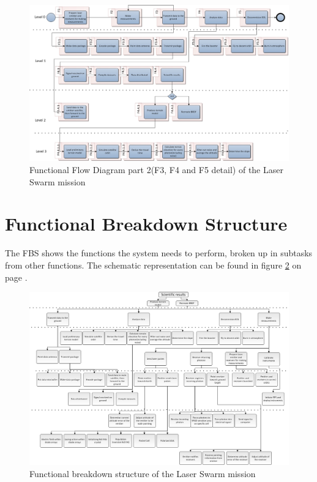 \begin{landscape}
\begin{figure}[ht!]
\centering
\includegraphics[width=1.3\textheight]{chapters/img/FFD2.jpg}
\caption{Functional Flow Diagram part 2(F3, F4 and F5 detail) of the Laser Swarm mission}
\label{FFD2}
\end{figure}
\end{landscape}

\section{Functional Breakdown Structure}
\label{section_FBS}
The \ac{FBS} shows the functions the system needs to perform, broken up in subtasks from other functions. The schematic representation can be found in figure \ref{FBS} on page \pageref{FBS}.

\begin{landscape}
\begin{figure}[ht!]
\centering
\includegraphics[width=1.3\textheight]{chapters/img/FBD.jpg}
\caption{Functional breakdown structure of the Laser Swarm mission}
\label{FBS}
\end{figure}
\end{landscape}

